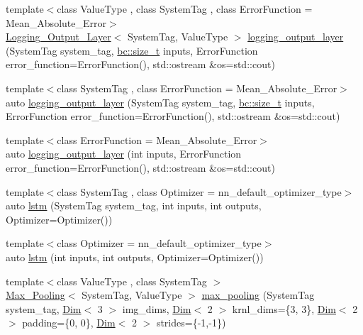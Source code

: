 \begin{DoxyCompactItemize}
\item 
{\footnotesize template$<$class Value\+Type , class System\+Tag , class Error\+Function  = Mean\+\_\+\+Absolute\+\_\+\+Error$>$ }\\\hyperlink{structbc_1_1nn_1_1Logging__Output__Layer}{Logging\+\_\+\+Output\+\_\+\+Layer}$<$ System\+Tag, Value\+Type $>$ \hyperlink{namespacebc_1_1nn_a0e09424bd9585d7fac8f168894315054}{logging\+\_\+output\+\_\+layer} (System\+Tag system\+\_\+tag, \hyperlink{namespacebc_aaf8e3fbf99b04b1b57c4f80c6f55d3c5}{bc\+::size\+\_\+t} inputs, Error\+Function error\+\_\+function=Error\+Function(), std\+::ostream \&os=std\+::cout)
\item 
{\footnotesize template$<$class System\+Tag , class Error\+Function  = Mean\+\_\+\+Absolute\+\_\+\+Error$>$ }\\auto \hyperlink{namespacebc_1_1nn_acb61279448bd2071e5ecdb743b6109a4}{logging\+\_\+output\+\_\+layer} (System\+Tag system\+\_\+tag, \hyperlink{namespacebc_aaf8e3fbf99b04b1b57c4f80c6f55d3c5}{bc\+::size\+\_\+t} inputs, Error\+Function error\+\_\+function=Error\+Function(), std\+::ostream \&os=std\+::cout)
\item 
{\footnotesize template$<$class Error\+Function  = Mean\+\_\+\+Absolute\+\_\+\+Error$>$ }\\auto \hyperlink{namespacebc_1_1nn_ab353668fc04b2496759be76e26c1697d}{logging\+\_\+output\+\_\+layer} (int inputs, Error\+Function error\+\_\+function=Error\+Function(), std\+::ostream \&os=std\+::cout)
\item 
{\footnotesize template$<$class System\+Tag , class Optimizer  = nn\+\_\+default\+\_\+optimizer\+\_\+type$>$ }\\auto \hyperlink{namespacebc_1_1nn_a0a16bba0c1484ef3e4c1785b18a08333}{lstm} (System\+Tag system\+\_\+tag, int inputs, int outputs, Optimizer=Optimizer())
\item 
{\footnotesize template$<$class Optimizer  = nn\+\_\+default\+\_\+optimizer\+\_\+type$>$ }\\auto \hyperlink{namespacebc_1_1nn_a0a21d00395e6af5b4c8b3c298b677195}{lstm} (int inputs, int outputs, Optimizer=Optimizer())
\item 
{\footnotesize template$<$class Value\+Type , class System\+Tag $>$ }\\\hyperlink{structbc_1_1nn_1_1Max__Pooling}{Max\+\_\+\+Pooling}$<$ System\+Tag, Value\+Type $>$ \hyperlink{namespacebc_1_1nn_a767fb1c413a31da42831d6bdc91b10af}{max\+\_\+pooling} (System\+Tag system\+\_\+tag, \hyperlink{structbc_1_1Dim}{Dim}$<$ 3 $>$ img\+\_\+dims, \hyperlink{structbc_1_1Dim}{Dim}$<$ 2 $>$ krnl\+\_\+dims=\{3, 3\}, \hyperlink{structbc_1_1Dim}{Dim}$<$ 2 $>$ padding=\{0, 0\}, \hyperlink{structbc_1_1Dim}{Dim}$<$ 2 $>$ strides=\{-\/1,-\/1\})

\end{DoxyCompactItemize}
